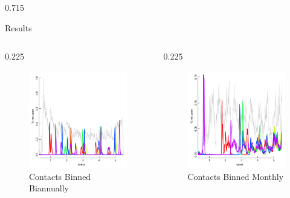 \documentclass[final]{beamer} %
\newcommand{\spaceProp}{0.02}
\newcommand{\spacer}{\begin{column}{\spaceProp\paperwidth}\end{column}}
\newenvironment{oneCol}{\begin{column}[t]{0.225\paperwidth}}{\end{column}}
\newenvironment{threeCol}{\begin{column}[t]{0.715\paperwidth}}{\end{column}}
\begin{document}
\begin{frame}{}
\begin{columns}[t]
\begin{threeCol}
\begin{block}{Results}
\begin{columns}
\begin{oneCol}
\begin{figure}
      \end{figure}
      \begin{figure}
        \includegraphics[width=1.0\linewidth]{out180.png}
        \caption{Contacts Binned Biannually}
      \end{figure}  
    \end{oneCol}
    \begin{oneCol}
      \begin{figure}
        \caption{Contacts Binned Monthly}
        \includegraphics[width=1.0\linewidth]{out30.png}

\end{figure}
\end{oneCol}
\end{columns}
\end{block}
\end{threeCol}
\end{columns}
\end{frame}
\end{document}
